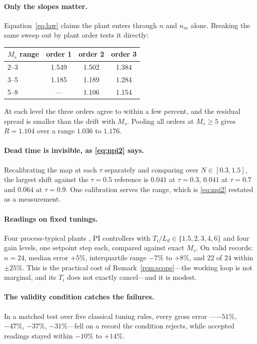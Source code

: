 \documentclass[final,3p,times,twocolumn]{elsarticle}
\begin{document}
\paragraph{Only the slopes matter.}
Equation~\eqref{eq:law} claims the plant enters through $n$ and $n_m$
alone. Breaking the same sweep out by plant order tests it directly:

\begin{center}
\begin{tabular}{lccc}
\toprule
$M_s$ range & order 1 & order 2 & order 3 \\
\midrule
2--3 & 1.549 & 1.502 & 1.384 \\
3--5 & 1.185 & 1.189 & 1.284 \\
5--8 & ---   & 1.106 & 1.154 \\
\bottomrule
\end{tabular}
\end{center}

\noindent
At each level the three orders agree to within a few percent, and the
residual spread is smaller than the drift with $M_s$. Pooling all orders
at $M_s\ge5$ gives $R=1.104$ over a range $1.036$ to $1.176$.

\paragraph{Dead time is invisible, as \eqref{eq:npi2} says.}
Recalibrating the map at each $\tau$ separately and comparing over
$N\in[0.3,1.5]$, the largest shift against the $\tau=0.5$ reference is
$0.041$ at $\tau=0.3$, $0.041$ at $\tau=0.7$ and $0.064$ at $\tau=0.9$.
One calibration serves the range, which is \eqref{eq:npi2} restated as a
measurement.

\paragraph{Readings on fixed tunings.}
Four process-typical plants \cite{SPIN}, PI controllers with
$T_i/L_d\in\{1.5,2,3,4,6\}$ and four gain levels, one setpoint step
each, compared against exact $M_s$. On valid records: $n=24$, median
error $+5\%$, interquartile range $-7\%$ to $+8\%$, and $22$ of $24$
within $\pm25\%$. This is the practical cost of
Remark~\ref{rem:scope}---the working loop is not marginal, and its $T_i$
does not exactly cancel---and it is modest.

\paragraph{The validity condition catches the failures.}
In a matched test over five classical tuning rules, every gross error
---$-51\%$, $-47\%$, $-37\%$, $-31\%$---fell on a record the condition
rejects, while accepted readings stayed within $-10\%$ to $+14\%$.
\end{document}
